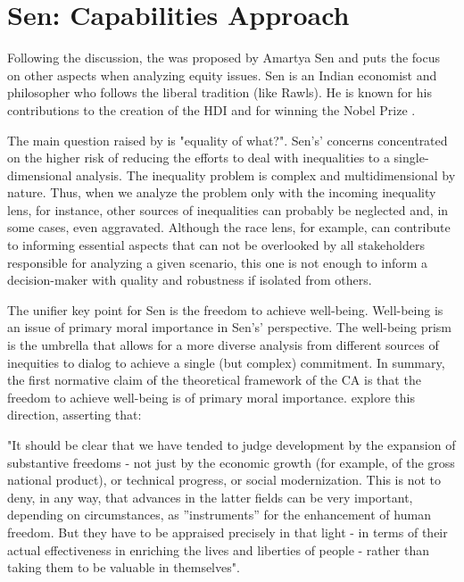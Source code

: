 \section{Sen: Capabilities Approach}
\label{equity-sec:sen-ca}

Following the discussion, the  was proposed by Amartya Sen and puts the focus on other aspects when analyzing equity issues. Sen is an Indian economist and philosopher who follows the liberal tradition (like Rawls). He is known for his contributions to the creation of the \gls{HDI} \cite{bomfim:2012} and for winning the Nobel Prize \cite{nobel:2022}.

The main question raised by  is "equality of what?". Sen's' concerns concentrated on the higher risk of reducing the efforts to deal with inequalities to a single-dimensional analysis. The inequality problem is complex and multidimensional by nature. Thus, when we analyze the problem only with the incoming inequality lens, for instance, other sources of inequalities can probably be neglected and, in some cases, even aggravated. Although the race lens, for example, can contribute to informing essential aspects that can not be overlooked by all stakeholders responsible for analyzing a given scenario, this one is not enough to inform a decision-maker with quality and robustness if isolated from others.

The unifier key point for Sen is the freedom to achieve well-being. Well-being is an issue of primary moral importance in Sen's' perspective. The well-being prism is the umbrella that allows for a more diverse analysis from different sources of inequities to dialog to achieve a single (but complex) commitment. In summary, the first normative claim of the theoretical framework of the \gls{CA} is that the freedom to achieve well-being is of primary moral importance.  explore this direction, asserting that:
\begin{citacao}
    "It should be clear that we have tended to judge development by the expansion of substantive freedoms - not just by the economic growth (for example, of the gross national product), or technical progress, or social modernization. This is not to deny, in any way, that advances in the latter fields can be very important, depending on circumstances, as ''instruments'' for the enhancement of human freedom. But they have to be appraised precisely in that light - in terms of their actual effectiveness in enriching the lives and liberties of people - rather than taking them to be valuable in themselves".
\end{citacao}


